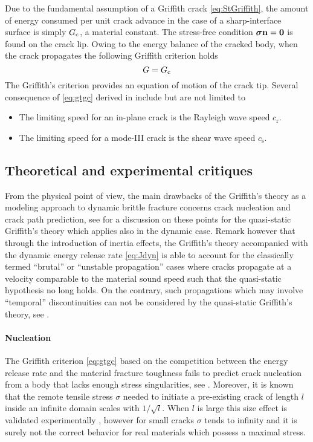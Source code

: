 Due to the fundamental assumption of a Griffith crack \eqref{eq:StGriffith}, the amount of energy consumed per unit crack advance in the case of a sharp-interface surface is simply $G_\mathrm{c}$, a material constant. The stress-free condition $\sig\vec{n}=\vec{0}$ is found on the crack lip. Owing to the energy balance of the cracked body, when the crack propagates the following Griffith criterion holds
\begin{equation} \label{eq:gtgc}
G=G_\mathrm{c}
\end{equation}
The Griffith's criterion provides an equation of motion of the crack tip. Several consequence of \eqref{eq:gtgc} derived in \cite{Freund:1990} include but are not limited to
\begin{itemize}
\item The limiting speed for an in-plane crack is the Rayleigh wave speed $c_\mathrm{r}$. %
\item The limiting speed for a mode-III crack is the shear wave speed $c_\mathrm{s}$.
\end{itemize}

\subsection{Theoretical and experimental critiques}
From the physical point of view, the main drawbacks of the Griffith's theory as a modeling approach to dynamic brittle fracture concerns crack nucleation and crack path prediction, see \cite{FrancfortMarigo:1998} for a discussion on these points for the quasi-static Griffith's theory which applies also in the dynamic case. Remark however that through the introduction of inertia effects, the Griffith's theory accompanied with the dynamic energy release rate \eqref{eq:Jdyn} is able to account for the classically termed ``brutal'' or ``unstable propagation'' cases where cracks propagate at a velocity comparable to the material sound speed such that the quasi-static hypothesis no long holds. On the contrary, such propagations which may involve ``temporal'' discontinuities can not be considered by the quasi-static Griffith's theory, see \cite{FrancfortMarigo:1998}.

\paragraph{Nucleation} The Griffith criterion \eqref{eq:gtgc} based on the competition between the energy release rate and the material fracture toughness fails to predict crack nucleation from a body that lacks enough stress singularities, see \cite{Marigo:2010}. Moreover, it is known that the remote tensile stress $\sigma$ needed to initiate a pre-existing crack of length $l$ inside an infinite domain scales with $1/\sqrt{l}$. When $l$ is large this size effect is validated experimentally \cite{Griffith:1921}, however for small cracks $\sigma$ tends to infinity and it is surely not the correct behavior for real materials which possess a maximal stress. 

